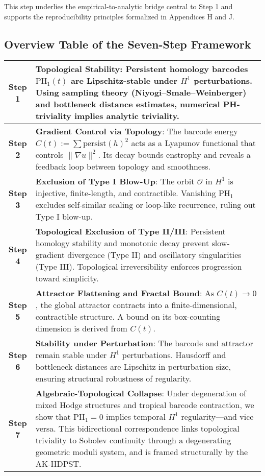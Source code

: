 \documentclass[11pt]{article}
\theoremstyle{definition}
\begin{document}
This step underlies the empirical-to-analytic bridge central to Step 1 and supports the reproducibility principles formalized in Appendices H and J.

\subsection*{Overview Table of the Seven-Step Framework}

\begin{center}
\renewcommand{\arraystretch}{1.4}
\begin{tabular}{|c|p{12.5cm}|}
\hline
\textbf{Step 1} & \textbf{Topological Stability}: Persistent homology barcodes $\mathrm{PH}_1(t)$ are Lipschitz-stable under $H^1$ perturbations. Using sampling theory (Niyogi--Smale--Weinberger) and bottleneck distance estimates, numerical PH-triviality implies analytic triviality. \\
\hline
\textbf{Step 2} & \textbf{Gradient Control via Topology}: The barcode energy $C(t) := \sum \mathrm{persist}(h)^2$ acts as a Lyapunov functional that controls $\|\nabla u\|^2$. Its decay bounds enstrophy and reveals a feedback loop between topology and smoothness. \\
\hline
\textbf{Step 3} & \textbf{Exclusion of Type I Blow-Up}: The orbit $\mathcal{O}$ in $H^1$ is injective, finite-length, and contractible. Vanishing $\mathrm{PH}_1$ excludes self-similar scaling or loop-like recurrence, ruling out Type I blow-up. \\
\hline
\textbf{Step 4} & \textbf{Topological Exclusion of Type II/III}: Persistent homology stability and monotonic decay prevent slow-gradient divergence (Type II) and oscillatory singularities (Type III). Topological irreversibility enforces progression toward simplicity. \\
\hline
\textbf{Step 5} & \textbf{Attractor Flattening and Fractal Bound}: As $C(t) \to 0$, the global attractor contracts into a finite-dimensional, contractible structure. A bound on its box-counting dimension is derived from $C(t)$. \\
\hline
\textbf{Step 6} & \textbf{Stability under Perturbation}: The barcode and attractor remain stable under $H^1$ perturbations. Hausdorff and bottleneck distances are Lipschitz in perturbation size, ensuring structural robustness of regularity. \\
\hline
\textbf{Step 7} & \textbf{Algebraic-Topological Collapse}: Under degeneration of mixed Hodge structures and tropical barcode contraction, we show that $\mathrm{PH}_1 = 0$ implies temporal $H^1$ regularity---and vice versa. This bidirectional correspondence links topological triviality to Sobolev continuity through a degenerating geometric moduli system, and is framed structurally by the AK-HDPST.
\\
\hline
\end{tabular}
\end{center}
\end{document}
